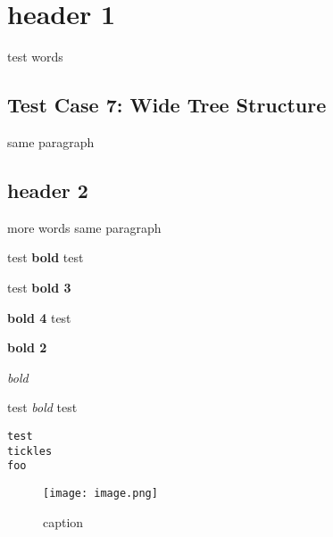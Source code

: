 \documentclass{article}
\begin{document}
\section{header 1}
test words

\subsection{Test Case 7: Wide Tree Structure}
same paragraph
\subsection{header 2}
more words same paragraph

test \textbf{bold} test

test \textbf{bold 3}

\textbf{bold 4} test

\textbf{bold 2}

\emph{bold}

test \emph{bold} test


\begin{verbatim}
test
tickles
foo
\end{verbatim}
\begin{figure}[h]\centering\texttt{[image: image.png]}\caption{caption}\end{figure}
\end{document}
